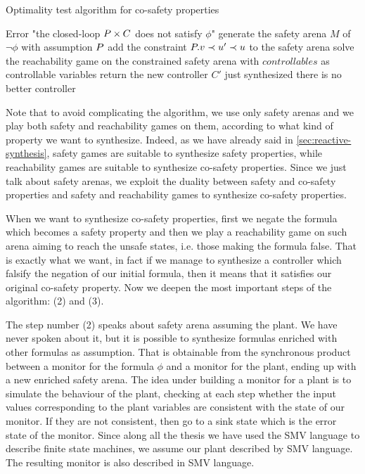 \begin{algorithm}[ht]
    \caption{Optimality test algorithm for co-safety properties}
\begin{algorithmic}[1]
    \If{$\closedloop{\plant}{\controller} \not\models \phi$}
        \State Error "the closed-loop $P \times C$ does not satisfy $\phi$"
    \EndIf
    \State generate the safety arena $M$ of $\neg\phi$ with assumption $P$
    \State add the constraint $P.v \prec u' \prec u$ to the safety arena
    \State solve the reachability game on the constrained safety arena with $controllables$ as controllable variables
        \State \Return return the new controller $C'$ just synthesized
    \Else
        \State \Return there is no better controller
    \EndIf
\EndProcedure
\end{algorithmic}
\end{algorithm}

Note that to avoid complicating the algorithm, we use only safety arenas and we play both safety and reachability games on them, according to what kind of property we want to synthesize.
Indeed, as we have already said in \autoref{sec:reactive-synthesis}, safety games are suitable to synthesize safety properties, while reachability games are suitable to synthesize co-safety properties.
Since we just talk about safety arenas, we exploit the duality between safety and co-safety properties and safety and reachability games to synthesize co-safety properties.

When we want to synthesize co-safety properties, first we negate the formula which becomes a safety property and then we play a reachability game on such arena aiming to reach the unsafe states, i.e. those making the formula false. 
That is exactly what we want, in fact if we manage to synthesize a controller which falsify the negation of our initial formula, then it means that it satisfies our original co-safety property. 
Now we deepen the most important steps of the algorithm: (2) and (3).

The step number (2) speaks about safety arena assuming the plant.
We have never spoken about it, but it is possible to synthesize formulas enriched with other formulas as assumption.
That is obtainable from the synchronous product between a monitor for the formula $\phi$ and a monitor for the plant, ending up with a new enriched safety arena.
The idea under building a monitor for a plant is to simulate the behaviour of the plant, checking at each step whether the input values corresponding to the plant variables are consistent with the state of our monitor.
If they are not consistent, then go to a sink state which is the error state of the monitor.
Since along all the thesis we have used the SMV language to describe finite state machines, we assume our plant described by SMV language. 
The resulting monitor is also described in SMV language.

